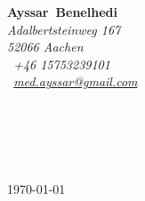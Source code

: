 

\pagestyle{empty}


\setlength{\parindent}{0pt}
\addtolength{\parskip}{6pt}

\def\firstname{Ayssar}
\def\familyname{Benelhedi}
\def\FileAuthor{\firstname~\familyname}
\def\FileTitle{\firstname~\familyname's Bewerbungsschreiben}
\def\FileSubject{Bewerbungsschreiben}
\def\FileKeyWords{\firstname~\familyname, Bewerbungsschreiben}

\renewcommand{\ttdefault}{pcr}



\hypersetup{pdfborder=0 0 0}


\sffamily   %
\hfill%
\begin{minipage}[t]{.6\textwidth}
	\raggedleft%
	{\bfseries {\color{firstnamecolor}\firstname}~{\color{firstnamecolor}\familyname}}\\[.35ex]
	\small\itshape%
	Adalbertsteinweg 167\\
	52066 Aachen\\[.35ex]
	\Mobilefone~+46 15753239101\\
	\Letter~\href{mailto:med.ayssar@gmail.com}{med.ayssar@gmail.com}
\end{minipage}\\[0.5em]
%
%
\begin{minipage}[t]{.4\textwidth}
	\raggedright%
	\vspace*{1em}
	\firmaName\\[.15ex]
	\small%
	\firmaStreet\\
\end{minipage}
%
\hfill
%
\begin{minipage}[t]{.4\textwidth}
	\raggedleft %
	\today
\end{minipage}\\[1em]
\raggedright

\begin{center}
	\vspace{1.5em}
	\Large{\bfseries \color{familynamecolor}\jobName}\\[1.5em]

\end{center}

